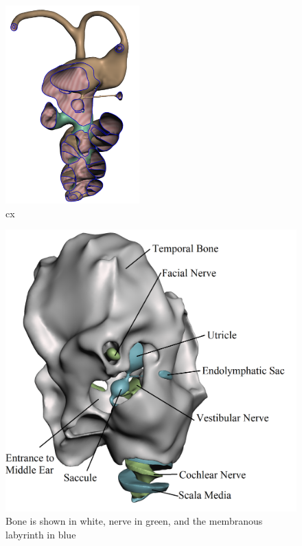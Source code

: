 \documentclass[10pt]{article}
\begin{document}
\begin{figure}[H]
	\centering
	\includegraphics[height=3in]{bullacx}
	\caption{cx}
	\label{cx}
\end{figure}

\begin{figure}[H]
	\centering
	\includegraphics[width=\linewidth]{bonenerve}
	\caption{Bone is shown in white, nerve in green, and the membranous labyrinth in blue}
	\label{bonenerve}
\end{figure}
\end{document}
